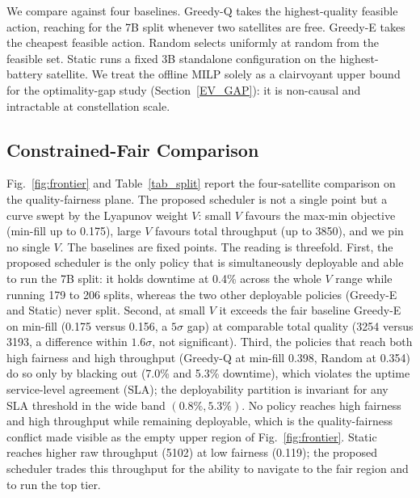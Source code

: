 We compare against four baselines. Greedy-Q takes the highest-quality feasible
action, reaching for the 7B split whenever two satellites are free. Greedy-E
takes the cheapest feasible action. Random selects uniformly at random from the
feasible set. Static runs a fixed 3B standalone configuration on the
highest-battery satellite. We treat the offline MILP solely as a clairvoyant
upper bound for the optimality-gap study (Section~\ref{EV_GAP}): it is
non-causal and intractable at constellation scale.

\subsection{Constrained-Fair Comparison}\label{EV_MULTI}
Fig.~\ref{fig:frontier} and Table~\ref{tab_split} report the four-satellite
comparison on the quality-fairness plane. The proposed scheduler is not a
single point but a curve swept by the Lyapunov weight $V$: small $V$ favours
the max-min objective (min-fill up to 0.175), large $V$ favours total
throughput (up to 3850), and we pin no single $V$. The baselines are fixed
points. The reading is threefold. First, the proposed scheduler is the only
policy that is simultaneously deployable and able to run the 7B split: it holds
downtime at 0.4\% across the whole $V$ range while running 179 to 206 splits,
whereas the two other deployable policies (Greedy-E and Static) never split.
Second, at small $V$ it exceeds the fair baseline Greedy-E on min-fill (0.175
versus 0.156, a $5\sigma$ gap) at comparable total quality (3254 versus 3193, a
difference within $1.6\sigma$, not significant). Third, the policies that reach
both high fairness and high throughput (Greedy-Q at min-fill 0.398, Random at
0.354) do so only by blacking out (7.0\% and 5.3\% downtime), which violates
the uptime service-level agreement (SLA); the deployability partition is
invariant for any SLA threshold in the wide band $(0.8\%, 5.3\%)$. No policy
reaches high fairness and high throughput while remaining deployable, which is
the quality-fairness conflict made visible as the empty upper region of
Fig.~\ref{fig:frontier}. Static reaches higher raw throughput (5102) at low
fairness (0.119); the proposed scheduler trades this throughput for the ability
to navigate to the fair region and to run the top tier.

